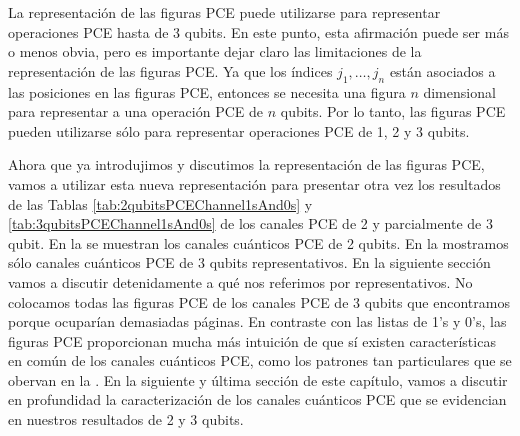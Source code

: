 
La representación de las figuras PCE puede utilizarse para representar 
operaciones PCE hasta de 3 qubits. En este punto, esta afirmación puede 
ser más o menos obvia, pero es importante dejar claro las limitaciones de 
la representación de las figuras PCE. 
Ya que los índices $j_1,\ldots,j_n$ están asociados a las posiciones 
en las figuras PCE, entonces se necesita una figura $n$ dimensional para representar 
a una operación PCE de $n$ qubits. Por lo tanto, las figuras PCE pueden
utilizarse sólo para representar operaciones PCE de 1, 2 y 3 qubits. 


Ahora que ya introdujimos y discutimos la representación de las figuras PCE,
vamos a utilizar esta nueva representación para presentar otra vez 
los resultados de las Tablas \ref{tab:2qubitsPCEChannel1sAnd0s} 
y \ref{tab:3qubitsPCEChannel1sAnd0s} de los canales PCE de 2 y 
parcialmente de 3 qubit.
En la  se muestran los canales cuánticos PCE de 2 qubits. 
En la  
mostramos sólo canales cuánticos PCE de 3 qubits representativos. En la siguiente 
sección vamos a discutir detenidamente a qué nos referimos por representativos.
No colocamos todas las figuras PCE de los canales PCE de 3 qubits que 
encontramos porque ocuparían demasiadas páginas.
En contraste con las listas de 1's y 0's, las figuras PCE proporcionan mucha 
más intuición de que sí existen características en común de los canales 
cuánticos PCE, como los patrones tan particulares que se obervan en la
. En la siguiente y última sección 
de este capítulo, vamos a discutir en profundidad la caracterización de los 
canales cuánticos PCE que se evidencian en nuestros resultados de 2 y 3 qubits.

